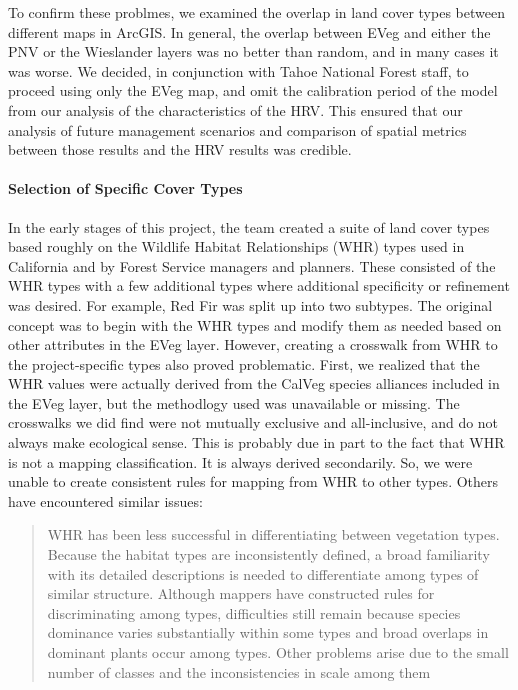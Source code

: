 To confirm these problmes, we examined the overlap in land cover types between different maps in ArcGIS. In general, the overlap between EVeg and either the PNV or the Wieslander layers was no better than random, and in many cases it was worse. We decided, in conjunction with Tahoe National Forest staff, to proceed using only the EVeg map, and omit the calibration period of the model from our analysis of the characteristics of the HRV. This ensured that our analysis of future management scenarios and comparison of spatial metrics between those results and the HRV results was credible.

\paragraph{Selection of Specific Cover Types}
In the early stages of this project, the team created a suite of land cover types based roughly on the Wildlife Habitat Relationships (WHR) types used in California and by Forest Service managers and planners. These consisted of the WHR types with a few additional types where additional specificity or refinement was desired. For example, Red Fir was split up into two subtypes. The original concept was to begin with the WHR types and modify them as needed based on other attributes in the EVeg layer. However, creating a crosswalk from WHR to the project-specific types also proved problematic. First, we realized that the WHR values were actually derived from the CalVeg species alliances included in the EVeg layer, but the methodlogy used was unavailable or missing. The crosswalks we did find  were not mutually exclusive and all-inclusive, and do not always make ecological sense. This is probably due in part to the fact that WHR is not a mapping classification. It is always derived secondarily. So, we were unable to create consistent rules for mapping from WHR to other types. Others have encountered similar issues:

\begin{quote}
WHR has been less successful in differentiating between vegetation types. Because the habitat types are inconsistently defined, a broad familiarity with its detailed descriptions is needed to differentiate among types of similar structure. Although mappers have constructed rules for discriminating among types, difficulties still remain because species dominance varies substantially within some types and broad overlaps in dominant plants occur among types. Other problems arise due to the small number of classes and the inconsistencies in scale among them 
\end{quote}

